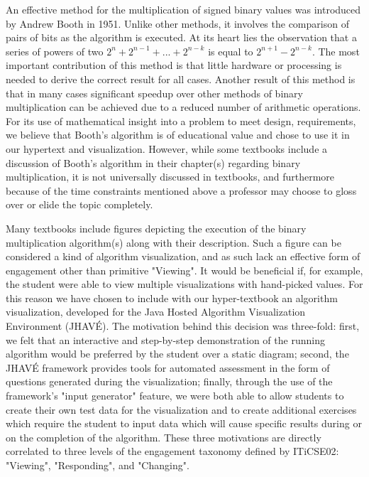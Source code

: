 \documentclass{acm_proc_article-sp}
\begin{document}
An effective method for the multiplication of signed binary values was introduced by Andrew Booth in 1951.
Unlike other methods, it involves the comparison of pairs of bits as the algorithm is executed.
At its heart lies the observation that a series of powers of two $2^n + 2^{n-1} + ...
+ 2^{n-k}$ is equal to $2^{n+1} - 2^{n-k}$.
The most important contribution of this method is that little hardware or processing is needed to derive the correct result for all cases\cite{needsCitation}.
Another result of this method is that in many cases significant speedup over other methods of binary multiplication can be achieved due to a reduced number of arithmetic operations.\cite{needsCitation}
For its use of mathematical insight into a problem to meet design, requirements, we believe that Booth's algorithm is of educational value and chose to use it in our hypertext and visualization.
However, while some textbooks include a discussion of Booth's algorithm in their chapter(s) regarding binary multiplication, it is not universally discussed in textbooks, and furthermore because of the time constraints mentioned above a professor may choose to gloss over or elide the topic completely.

Many textbooks include figures depicting the execution of the binary multiplication algorithm(s) along with their description.
Such a figure can be considered a kind of algorithm visualization, and as such lack an effective form of engagement other than primitive "Viewing".
It would be beneficial if, for example, the student were able to view multiple visualizations with hand-picked values.
For this reason we have chosen to include with our hyper-textbook an algorithm visualization, developed for the Java Hosted Algorithm Visualization Environment (JHAVÉ)\cite{JHAVE}.
The motivation behind this decision was three-fold: first, we felt that an interactive and step-by-step demonstration of the running algorithm would be preferred by the student over a static diagram; second, the JHAVÉ framework provides tools for automated assessment in the form of questions generated during the visualization; finally, through the use of the framework's "input generator" feature, we were both able to allow students to create their own test data for the visualization and to create additional exercises which require the student to input data which will cause specific results during or on the completion of the algorithm.
These three motivations are directly correlated to three levels of the engagement taxonomy defined by ITiCSE02: "Viewing", "Responding", and "Changing".
\end{document}
